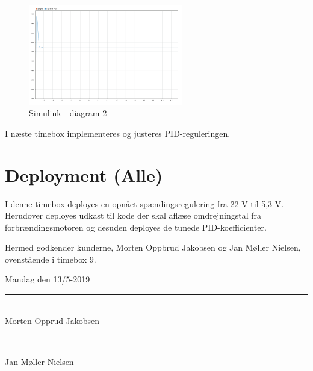 \begin{figure}[h]
  \centering
  \includegraphics[width=0.6\textwidth]{sbil2.png}
  \caption{Simulink - diagram 2}
  \label{fig:sbil1}
\end{figure}

I næste timebox implementeres og justeres PID-reguleringen.
\clearpage
\section{Deployment (Alle)}
\label{sec:deployment}

I denne timebox deployes en opnået spændingsregulering fra 22 V til 5,3 V. Herudover deployes udkast til kode der skal aflæse omdrejningstal fra forbrændingsmotoren og desuden deployes de tunede PID-koefficienter.

Hermed godkender kunderne, Morten Oppbrud Jakobsen og Jan Møller Nielsen, ovenstående i timebox 9.

Mandag den 13/5-2019

\begin{minipage}{.5\textwidth}
  \begin{center}
    \vspace{1.4cm}
    \rule{0.8\textwidth}{0.1pt}\\
    \small{Morten Opprud Jakobsen\\%
    }
  \end{center}
\end{minipage}%
\begin{minipage}{0.5\textwidth}
  \begin{center}
    \vspace{1.4cm}
    \rule{0.8\textwidth}{0.1pt}\\
    \small{Jan Møller Nielsen\\%
    }
  \end{center}
\end{minipage}

